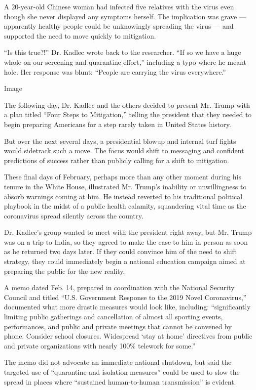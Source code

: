A 20-year-old Chinese woman had infected five relatives with the virus
even though she never displayed any symptoms herself. The implication
was grave --- apparently healthy people could be unknowingly spreading
the virus --- and supported the need to move quickly to mitigation.

``Is this true?!'' Dr. Kadlec wrote back to the researcher. ``If so we
have a huge whole on our screening and quarantine effort,'' including a
typo where he meant hole. Her response was blunt: ``People are carrying
the virus everywhere.''

Image

The following day, Dr. Kadlec and the others decided to present Mr.
Trump with a plan titled ``Four Steps to Mitigation,'' telling the
president that they needed to begin preparing Americans for a step
rarely taken in United States history.

But over the next several days, a presidential blowup and internal turf
fights would sidetrack such a move. The focus would shift to messaging
and confident predictions of success rather than publicly calling for a
shift to mitigation.

These final days of February, perhaps more than any other moment during
his tenure in the White House, illustrated Mr. Trump's inability or
unwillingness to absorb warnings coming at him. He instead reverted to
his traditional political playbook in the midst of a public health
calamity, squandering vital time as the coronavirus spread silently
across the country.

Dr. Kadlec's group wanted to meet with the president right away, but Mr.
Trump was on a trip to India, so they agreed to make the case to him in
person as soon as he returned two days later. If they could convince him
of the need to shift strategy, they could immediately begin a national
education campaign aimed at preparing the public for the new reality.

A memo dated Feb. 14, prepared in coordination with the National
Security Council and titled ``U.S. Government Response to the 2019 Novel
Coronavirus,'' documented what more drastic measures would look like,
including: ``significantly limiting public gatherings and cancellation
of almost all sporting events, performances, and public and private
meetings that cannot be convened by phone. Consider school closures.
Widespread `stay at home' directives from public and private
organizations with nearly 100\% telework for some.''

The memo did not advocate an immediate national shutdown, but said the
targeted use of ``quarantine and isolation measures'' could be used to
slow the spread in places where ``sustained human-to-human
transmission'' is evident.

